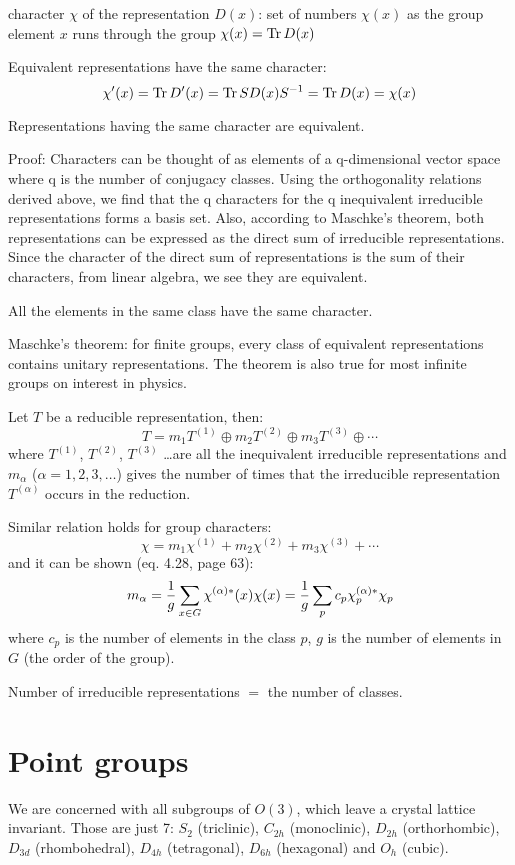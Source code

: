 character $\chi$ of the representation $D(x)$: set of numbers $\chi(x)$ as the
group element $x$ runs through the group $\chi(x)=\hbox{Tr}\, D(x)$

Equivalent representations have the same character:
$$\chi'(x)=\hbox{Tr}\, D'(x)=\hbox{Tr}\, SD(x)S^{-1}=\hbox{Tr}\, D(x)=\chi(x)$$

Representations having the same character are equivalent.

Proof: Characters can be thought of as elements of a q-dimensional vector space
where q is the number of conjugacy classes. Using the orthogonality relations
derived above, we find that the q characters for the q inequivalent irreducible
representations forms a basis set. Also, according to Maschke's theorem, both
representations can be expressed as the direct sum of irreducible
representations. Since the character of the direct sum of representations is
the sum of their characters, from linear algebra, we see they are equivalent.

All the elements in the same class have the same character.

Maschke's theorem: for finite groups, every class of equivalent representations
contains unitary representations. The theorem is also true for most infinite
groups on interest in physics.

Let $T$ be a reducible representation, then:
$$T=m_1T^{(1)} \oplus m_2T^{(2)} \oplus m_3T^{(3)}\oplus \cdots$$
where $T^{(1)}$, $T^{(2)}$, $T^{(3)}$ \dots are all the inequivalent irreducible
representations and $m_\alpha$ ($\alpha=1,2,3,\dots$) gives the number of times
that the irreducible representation $T^{(\alpha)}$ occurs in the reduction.

Similar relation holds for group characters:
$$\chi=m_1\chi^{(1)} + m_2\chi^{(2)} + m_3\chi^{(3)} + \cdots$$
and it can be shown \cite{elliott} (eq. 4.28, page 63):
$$m_\alpha={1\over g}\sum_{x\in G} \chi^{(\alpha)*}(x)\chi(x)=
{1\over g}\sum_{p} c_p\chi^{(\alpha)*}_p\chi_p$$
where $c_p$ is the number of elements in the class $p$, $g$ is the number of
elements in $G$ (the order of the group).

Number of irreducible representations $=$ the number of classes.


\section{Point groups}

We are concerned with all subgroups of $O(3)$, which leave a crystal lattice
invariant. Those are just 7: $S_2$ (triclinic), $C_{2h}$ (monoclinic), $D_{2h}$
(orthorhombic), $D_{3d}$ (rhombohedral), $D_{4h}$ (tetragonal), $D_{6h}$
(hexagonal) and $O_{h}$ (cubic).

